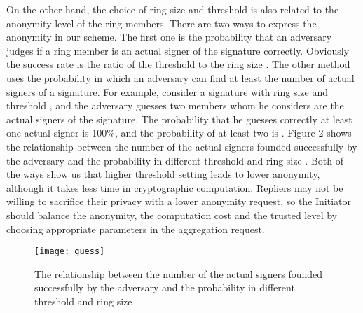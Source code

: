 \documentclass[a4paper]{article}
\begin{document}
On the other hand, the choice of ring size and threshold is also related to the anonymity level of the ring members. There are two ways to express the anonymity in our scheme. The first one is the probability that an adversary judges if a ring member is an actual signer of the signature correctly. Obviously the success rate is the ratio of the threshold  to the ring size .  The other method uses the probability in which an adversary can find at least the number of actual signers of a signature. For example, consider a signature with ring size  and threshold , and the adversary guesses two members whom he considers are the actual signers of the signature. The probability that he guesses correctly at least one actual signer is 100\%, and the probability of at least two is . Figure 2 shows the relationship between the number of the actual signers founded successfully by the adversary and the probability in different threshold  and ring size . Both of the ways show us that higher threshold setting leads to lower anonymity, although it takes less time in cryptographic computation. Repliers may not be willing to sacrifice their privacy with a lower anonymity request, so the Initiator should balance the anonymity, the computation cost and the trusted level by choosing appropriate parameters in the aggregation request.

\begin{figure}
  \centering
  \texttt{[image: guess]}
  \caption{The relationship between the number of the actual signers founded successfully by the adversary and the probability in different threshold  and ring size }
\end{figure}
\end{document}
